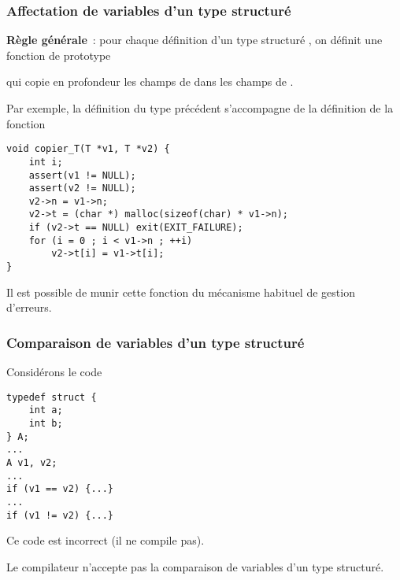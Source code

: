 \begin{frame}[fragile]
\frametitle{Affectation de variables d'un type structuré}
{\bf Règle générale}~: pour chaque définition d'un type structuré ,
on définit une fonction de prototype
\begin{center}
\end{center}
qui \alert{copie en profondeur} les champs de  dans les champs
de .
\medskip

Par exemple, la définition du type  précédent s'accompagne de la
définition de la fonction
\begin{lstlisting}
void copier_T(T *v1, T *v2) {
    int i;
    assert(v1 != NULL);
    assert(v2 != NULL);
    v2->n = v1->n;
    v2->t = (char *) malloc(sizeof(char) * v1->n);
    if (v2->t == NULL) exit(EXIT_FAILURE);
    for (i = 0 ; i < v1->n ; ++i)
        v2->t[i] = v1->t[i];
}
\end{lstlisting}

Il est possible de munir cette fonction du mécanisme habituel de
gestion d'erreurs.
\end{frame}

\begin{frame}[fragile]
\frametitle{Comparaison de variables d'un type structuré}
Considérons le code
\begin{multicols}{2}
\begin{lstlisting}
typedef struct {
    int a;
    int b;
} A;
...
A v1, v2;
...
if (v1 == v2) {...}
...
if (v1 != v2) {...}
\end{lstlisting}
\end{multicols}
\medskip

Ce code est incorrect (il ne compile pas).
\medskip

Le compilateur n'accepte pas la comparaison de variables d'un type
structuré.
\smallskip

\smallskip

\end{frame}


